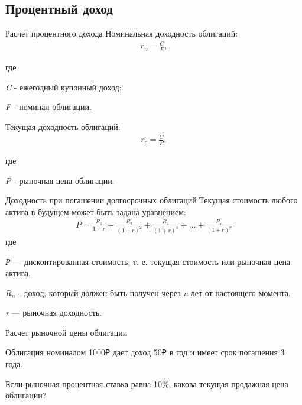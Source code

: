 \documentclass[_DKB_p1_Money.tex]{subfiles}
\begin{document}
\subsection{Процентный доход}
\begin{frame}[allowframebreaks]{Расчет процентного дохода}
Номинальная доходность облигаций:
\begin{align}
r_n=\frac{C}{F}, 
\end{align}

где

\textit{C} - ежегодный купонный доход;

\textit{F} - номинал облигации.

\pagebreak
Текущая доходность облигаций:
\begin{align}
r_c=\frac{C}{P},
\end{align}

где

\textit{P} - рыночная цена облигации.

\end{frame}

\begin{frame}{Доходность при погашении долгосрочных облигаций}
Текущая стоимость любого актива в   будущем может быть задана уравнением:
\begin{align}
P=\frac{R_1}{1+r}+\frac{R_2}{(1+r)^2}+\frac{R_3}{(1+r)^3}+...+\frac{R_n}{(1+r)^n}
\end{align}
где

\textit{Р} — дисконтированная стоимость, т. е. текущая стоимость или рыночная цена актива.

$R_n$ - доход, который должен быть получен через \textit{n} лет от настоящего момента.

\textit{r}  — рыночная доходность.
\end{frame}

\begin{frame}
Расчет рыночной цены облигации

Облигация номиналом 1000₽ дает доход 50₽ в год и имеет срок погашения 3 года. 

Если рыночная процентная ставка равна 10\%, какова текущая продажная цена облигации?
\end{frame}
\end{document}
